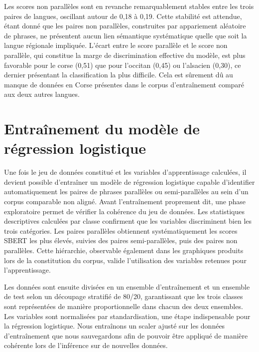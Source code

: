 Les scores non parallèles sont en revanche remarquablement stables entre les trois paires de langues,
oscillant autour de 0,18 à 0,19. Cette stabilité est attendue, étant donné que les paires non parallèles, construites
par appariement aléatoire de phrases, ne présentent aucun lien sémantique systématique quelle que soit
la langue régionale impliquée. L'écart entre le score parallèle et le score non parallèle, qui constitue
la marge de discrimination effective du modèle, est plus favorable pour le corse (0,51) que pour
l'occitan (0,45) ou l'alsacien (0,30), ce dernier présentant la classification la plus difficile.
Cela est sûrement dû au manque de données en Corse présentes dans le corpus d'entraînement comparé aux
deux autres langues.

\section{Entraînement du modèle de régression logistique}

Une fois le jeu de données constitué et les variables d'apprentissage calculées, il devient possible
d'entraîner un modèle de régression logistique capable d'identifier automatiquement les paires de phrases parallèles ou
semi-parallèles au sein d'un corpus comparable non aligné. Avant l'entraînement proprement dit, une phase exploratoire
permet de vérifier la cohérence du jeu de données.
Les statistiques descriptives calculées par classe confirment que les variables discriminent bien les trois
catégories. Les paires parallèles obtiennent systématiquement les scores SBERT les plus élevés, suivies
des paires semi-parallèles, puis des paires non parallèles. Cette hiérarchie, observable également dans
les graphiques produits lors de la constitution du corpus, valide l'utilisation des variables retenues pour
l'apprentissage.

Les données sont ensuite divisées en un ensemble d'entraînement et un ensemble de test selon un découpage
stratifié de 80/20, garantissant que les trois classes sont représentées de manière proportionnelle dans
chacun des deux ensembles. Les variables sont normalisées par standardisation, une étape indispensable pour
la régression logistique. Nous entraînons un scaler
ajusté sur les données d'entraînement que nous sauvegardons afin de pouvoir être appliqué de manière cohérente lors
de l'inférence sur de nouvelles données.

